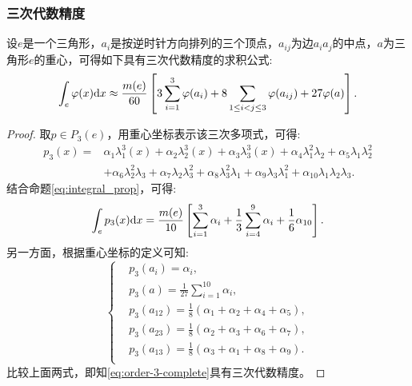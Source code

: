 \subsubsection{三次代数精度}
\begin{proposition}
    \label{prop:3order}
    设$e$是一个三角形，$a_{i}$是按逆时针方向排列的三个顶点，$a_{ij}$为边$a_{i}a_{j}$的中点，$a$为三角形$e$的重心，可得如下具有三次代数精度的求积公式:
    \begin{equation}
        \int_{e}\varphi(x)\mathrm{d} x\approx\frac{m(e)}{60}\left[3\sum_{i=1}^{3}\varphi(a_{i})+8\sum_{1\le i<j\le 3}\varphi(a_{ij})+27\varphi(a)\right].
    \end{equation}
\end{proposition}
\begin{proof}
    取$p\in P_{3}(e)$，用重心坐标表示该三次多项式，可得:
    \begin{equation}
        \label{eq:order-3-complete}
        \begin{aligned}
            p_{3}(x)=&\alpha_{1}\lambda_{1}^{3}(x)+\alpha_{2}\lambda_{2}^{3}(x)+\alpha_{3}\lambda_{3}^{3}(x)+\alpha_{4}\lambda_{1}^{2}\lambda_{2}+\alpha_{5}\lambda_{1}\lambda_{2}^{2}\\
            &+\alpha_{6}\lambda_{2}^{2}\lambda_{3}+\alpha_{7}\lambda_{2}\lambda_{3}^{2}+\alpha_{8}\lambda_{3}^{2}\lambda_{1}+\alpha_{9}\lambda_{3}\lambda_{1}^{2}+\alpha_{10}\lambda_{1}\lambda_{2}\lambda_{3}.
        \end{aligned}
    \end{equation}
    结合命题\ref{eq:integral_prop}，可得:
    \begin{equation}
        \int_{e}p_{3}(x)\mathrm{d} x=\frac{m(e)}{10}\left[\sum_{i=1}^{3}\alpha_{i}+\frac{1}{3}\sum_{i=4}^{9}\alpha_{i}+\frac{1}{6}\alpha_{10}\right].
    \end{equation}
    另一方面，根据重心坐标的定义可知:
    \begin{equation}
        \left\{
        \begin{aligned}
            &p_{3}(a_{i})=\alpha_{i},\\
            &p_{3}(a)=\frac{1}{27}\sum_{i=1}^{10}\alpha_{i},\\
            &p_{3}(a_{12})=\frac{1}{8}(\alpha_{1}+\alpha_{2}+\alpha_{4}+\alpha_{5}),\\
            &p_{3}(a_{23})=\frac{1}{8}(\alpha_{2}+\alpha_{3}+\alpha_{6}+\alpha_{7}),\\
            &p_{3}(a_{13})=\frac{1}{8}(\alpha_{3}+\alpha_{1}+\alpha_{8}+\alpha_{9}).\\
            \end{aligned}
        \right.
    \end{equation}
    比较上面两式，即知\eqref{eq:order-3-complete}具有三次代数精度。
\end{proof}
